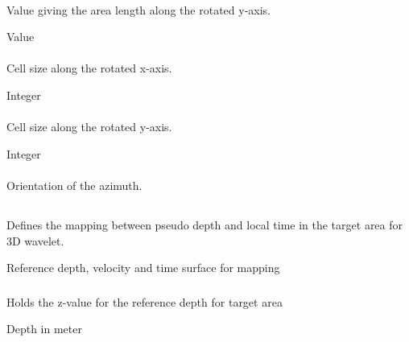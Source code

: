 \paragraph{}
 \slist
   \item \Description Value giving the area length along the rotated y-axis.
   \item \Argument Value
   \item \Default
 \elist

\paragraph{}
 \slist
   \item \Description Cell size along the rotated x-axis.
   \item \Argument Integer
   \item \Default
 \elist

\paragraph{}
 \slist
   \item \Description Cell size along the rotated y-axis.
   \item \Argument Integer
   \item \Default
 \elist

\paragraph{}
 \slist
   \item \Description Orientation of the azimuth.
   \item \Argument
   \item \Default
 \elist

\subsection{} 
 \slist
   \item \Description Defines the mapping between pseudo depth and local time in the target area for 3D wavelet.
   \item \Argument Reference depth, velocity and time surface for mapping
   \item \Default
 \elist

\subsubsection{} 
 \slist
   \item \Description Holds the z-value for the reference depth for target area
   \item \Argument Depth in meter
   \item \Default
\elist


